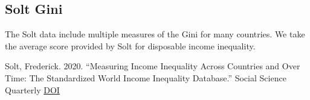 \documentclass[
]{article}
\newenvironment{Shaded}{\begin{snugshade}}{\end{snugshade}}
\newcommand{\CommentTok}[1]{\textcolor[rgb]{0.56,0.35,0.01}{\textit{#1}}}
\newcommand{\KeywordTok}[1]{\textcolor[rgb]{0.13,0.29,0.53}{\textbf{#1}}}
\newcommand{\NormalTok}[1]{#1}
\newcommand{\OperatorTok}[1]{\textcolor[rgb]{0.81,0.36,0.00}{\textbf{#1}}}
\newcommand{\StringTok}[1]{\textcolor[rgb]{0.31,0.60,0.02}{#1}}
\begin{document}
\hypertarget{solt-gini}{%
\subsection{Solt Gini}\label{solt-gini}}

The Solt data include multiple measures of the Gini for many countries.
We take the average score provided by Solt for disposable income
inequality.

Solt, Frederick. 2020. ``Measuring Income Inequality Across Countries
and Over Time: The Standardized World Income Inequality Database.''
Social Science Quarterly \href{https://doi.org/10.1111/ssqu.12795}{DOI}

\begin{Shaded}
\end{Shaded}
\end{document}
